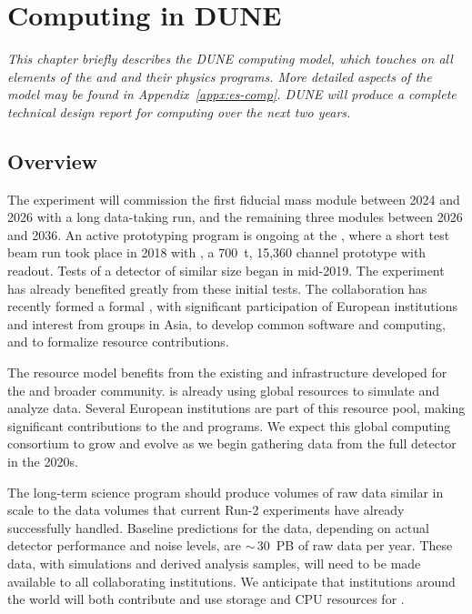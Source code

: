 \chapter{Computing in DUNE}
\label{ch:exec-comp}

\textit{This chapter briefly describes the DUNE computing model, which touches on all elements of the  and  and their physics programs.  More detailed aspects of the model may be found in Appendix~\ref{appx:es-comp}.  DUNE will produce a complete technical design report for computing over the next two years.}


\section{Overview}
\label{ch:exec-comp-es}


The  experiment will commission the first \nominalmodsize fiducial mass %
 module between 2024 and 2026 with a long data-taking run, and %
the remaining three modules between 2026 and 2036.  An active prototyping program is ongoing %
 at the , where   %
a short test beam run took place in 2018 with , a \SI{700}{t}, 15,360 channel prototype  with  readout.  Tests of a  detector of similar size began in mid-2019.   The  experiment has already benefited greatly from these initial tests.  The collaboration has recently formed a formal , with significant participation of European institutions and interest from groups in Asia, to develop common software and computing, and to formalize resource contributions.

The  resource model benefits from the existing   and  infrastructure developed for the  and broader  community.   is already using global resources to simulate and analyze   data.  Several European institutions are part of this resource pool, making significant contributions to the  and  programs.  We expect this global computing consortium to grow and evolve as we begin gathering data from the full  detector in the 2020s.

The long-term  science program should produce volumes of raw data similar in scale to the data volumes that current  Run-2 experiments have already successfully handled.  Baseline predictions for the  data, depending on actual detector performance and noise levels, are $\sim\,$\SI{30}{PB} of raw data per year.  These data, with simulations and derived analysis samples, %
will need to be made available to all collaborating institutions.  We anticipate that institutions around the world will both contribute and use storage and CPU resources for .

